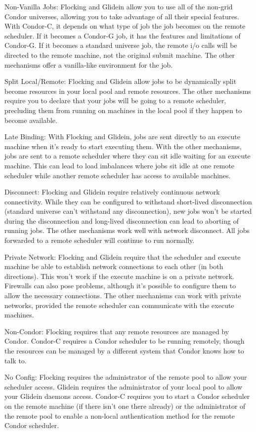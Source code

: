 Non-Vanilla Jobs: Flocking and Glidein allow you to use all of the
non-grid Condor universes, allowing you to take advantage of all their
special features. With Condor-C, it depends on what type of job the job
becomes on the remote scheduler. If it becomes a Condor-G job, it has the
features and limitations of Condor-G. If it becomes a standard universe
job, the remote i/o calls will be directed to the remote machine, not the
original submit machine. The other mechanisms offer a vanilla-like
environment for the job.

Split Local/Remote: Flocking and Glidein allow jobs to be dynamically
split become resources in your local pool and remote resources. The
other mechanisms require you to declare that your jobs will be going to
a remote scheduler, precluding them from running on machines in the local
pool if they happen to become available.

Late Binding: With Flocking and Glidein, jobs are sent directly to an
execute machine when it's ready to start executing them. With the other
mechanisms, jobs are sent to a remote scheduler where they can sit idle
waiting for an execute machine. This can lead to load imbalances where
jobs sit idle at one remote scheduler while another remote scheduler has
access to available machines.

Disconnect: Flocking and Glidein require relatively continuous network
connectivity. While they can be configured to withstand short-lived
disconnection (standard universe can't withstand any disconnection),
new jobs won't be started during the disconnection and long-lived
disconnection can lead to aborting of running jobs. The other mechanisms
work well with network disconnect. All jobs forwarded to a remote
scheduler will continue to run normally.

Private Network: Flocking and Glidein require that the scheduler and
execute machine be able to establish network connections to each other
(in both directions). This won't work if the execute machine is on a
private network. Firewalls can also pose problems, although it's possible
to configure them to allow the necessary connections. The other 
mechanisms can work with private networks, provided the remote scheduler
can communicate with the execute machines.

Non-Condor: Flocking requires that any remote resources are managed by
Condor. Condor-C requires a Condor scheduler to be running remotely,
though the resources can be managed by a different system that Condor
knows how to talk to.

No Config: Flocking requires the administrator of the remote pool to 
allow your scheduler access. Glidein requires the administrator of your
local pool to allow your Glidein daemons access. Condor-C requires you
to start a Condor scheduler on the remote machine (if there isn't one
there already) or the administrator of the remote pool to enable a
non-local authentication method for the remote Condor scheduler.


